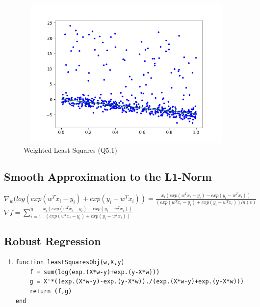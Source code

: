 \documentclass{article}
\begin{document}
\begin{figure}[h!]
  \includegraphics[width=30em,height=7.5cm]{a2_q5_1.png}
  \caption{Weighted Least Squares (Q5.1)}
  \label{fig:q5_1}
\end{figure}



\subsection{Smooth Approximation to the L1-Norm}

$\nabla _w(log(exp(w^Tx_i-y_i)+exp(y_i-w^Tx_i))= \frac{x_i(exp(w^Tx_i-y_i)-exp(y_i-w^Tx_i))}{(exp(w^Tx_i-y_i)+exp(y_i-w^Tx_i))ln(e)}$\\
$\nabla f= \sum\limits_{i=1}^{n}\frac{x_i(exp(w^Tx_i-y_i)-exp(y_i-w^Tx_i))}{(exp(w^Tx_i-y_i)+exp(y_i-w^Tx_i))}$

\subsection{Robust Regression}

\begin{enumerate}

\item
  \begin{verbatim}
function leastSquaresObj(w,X,y)
    f = sum(log(exp.(X*w-y)+exp.(y-X*w)))
    g = X'*((exp.(X*w-y)-exp.(y-X*w))./(exp.(X*w-y)+exp.(y-X*w)))
    return (f,g)
end

  \end{verbatim}

\end{enumerate}
\end{document}
